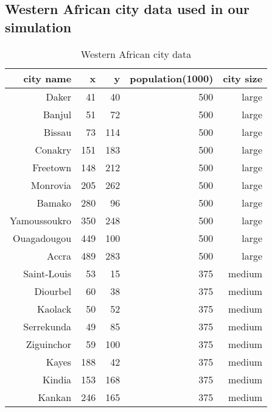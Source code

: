{\begin{appendices}
\subsection{Western African city data used in our simulation}
\begin{longtable}{|r|r|r|r|r|}
\caption{Western African city data}\\
\hline
{\bf city name} &    {\bf x} &    {\bf y} & {\bf population(1000)} & {\bf city size} \\
\hline
     Daker &         41 &         40 &        500 &      large \\
\hline
    Banjul &         51 &         72 &        500 &      large \\
\hline
    Bissau &         73 &        114 &        500 &      large \\
\hline
   Conakry &        151 &        183 &        500 &      large \\
\hline
  Freetown &        148 &        212 &        500 &      large \\
\hline
  Monrovia &        205 &        262 &        500 &      large \\
\hline
    Bamako &        280 &         96 &        500 &      large \\
\hline
Yamoussoukro &        350 &        248 &        500 &      large \\
\hline
Ouagadougou &        449 &        100 &        500 &      large \\
\hline
     Accra &        489 &        283 &        500 &      large \\
\hline
Saint-Louis &         53 &         15 &        375 &     medium \\
\hline
  Diourbel &         60 &         38 &        375 &     medium \\
\hline
   Kaolack &         50 &         52 &        375 &     medium \\
\hline
Serrekunda &         49 &         85 &        375 &     medium \\
\hline
Ziguinchor &         59 &        100 &        375 &     medium \\
\hline
     Kayes &        188 &         42 &        375 &     medium \\
\hline
    Kindia &        153 &        168 &        375 &     medium \\
\hline
    Kankan &        246 &        165 &        375 &     medium \\
\hline

\end{longtable}
\end{appendices}}
